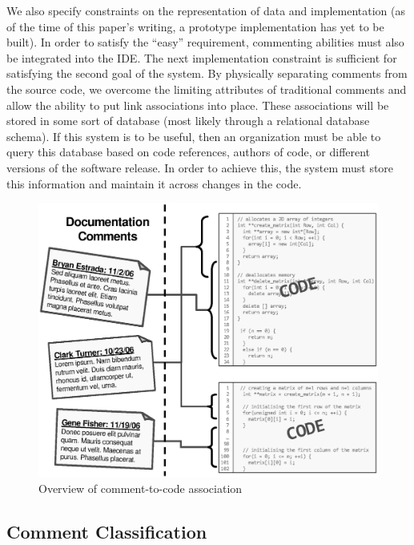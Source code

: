We also specify constraints on the representation of data and implementation (as
of the time of this paper's writing, a prototype implementation has yet to be
built). In order to satisfy the ``easy'' requirement, commenting abilities must
also be integrated into the IDE. The next implementation constraint is 
sufficient for satisfying the second goal of the system. By physically
separating comments from the source code, we overcome the limiting attributes of
traditional comments and allow the ability to put link associations into place.
These associations will be stored in some sort of database (most likely through
a relational database schema). If this system is to be useful, then an
organization must be able to query this database based on code references,
authors of code, or different versions of the software release. In order to
achieve this, the system must store this information and maintain it across
changes in the code.

\begin{figure}[t]
\begin{narrow}{-1.5in}{-1.5in}
\begin{center}
\includegraphics[width=\textwidth]{images/comments.eps}
\end{center}
\end{narrow}
\caption{Overview of comment-to-code association}
\label{comment_to_code}
\end{figure}

\subsection{Comment Classification}\label{comment_class}

